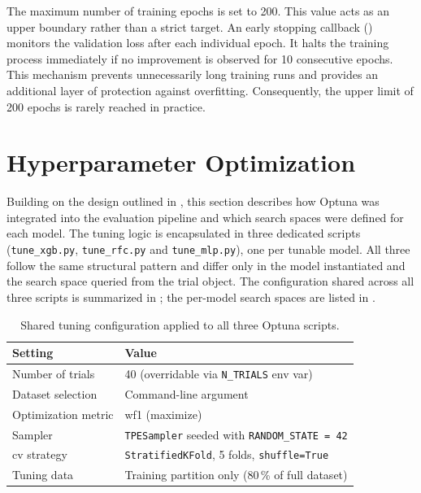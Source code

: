 The maximum number of training epochs is set to 200. This value acts as an upper boundary rather than a strict target. An early stopping callback () monitors the validation loss after each individual epoch. It halts the training process immediately if no improvement is observed for 10 consecutive epochs. This mechanism prevents unnecessarily long training runs and provides an additional layer of protection against overfitting. Consequently, the upper limit of 200 epochs is rarely reached in practice.






\section{Hyperparameter Optimization}
\label{implementation_tuning}

Building on the design outlined in , this section describes how Optuna was integrated into the evaluation pipeline and which search spaces were defined for each model. The tuning logic is encapsulated in three dedicated scripts (\texttt{tune\_xgb.py}, \texttt{tune\_rfc.py} and \texttt{tune\_mlp.py}), one per tunable model. All three follow the same structural pattern and differ only in the model instantiated and the search space queried from the trial object. The configuration shared across all three scripts is summarized in ; the per-model search spaces are listed in .

\begin{table}[htbp]
\centering
\caption{Shared tuning configuration applied to all three Optuna scripts.}
\label{tab:tuning_config}
\begin{tabular}{ll}
\toprule
\textbf{Setting} & \textbf{Value} \\
\midrule
Number of trials & 40 (overridable via \texttt{N\_TRIALS} env var) \\
Dataset selection & Command-line argument \\
Optimization metric & \gls{wf1} (maximize) \\
Sampler & \texttt{TPESampler} seeded with \texttt{RANDOM\_STATE = 42} \\
\gls{cv} strategy & \texttt{StratifiedKFold}, 5 folds, \texttt{shuffle=True} \\
Tuning data & Training partition only (80\,\% of full dataset) \\
\bottomrule
\end{tabular}
\end{table}

